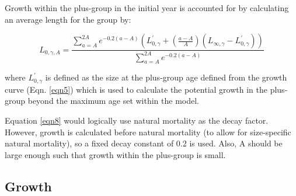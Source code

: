 \documentclass[11pt,
  english,
  letterpaper,
]{article}
\begin{document}
\leavevmode\tagmcend\tagstructend\par


Growth within the plus-group in the initial year is accounted for by calculating an average length for the group by:

\leavevmode\tagmcend\tagstructend\par


\begin{equation}
\label{eqn8}
L_{0,\gamma,A} = \frac{\sum_{a=A}^{2A}e^{-0.2(a-A)}(L_{0,\gamma}^{'}+(\frac{a-A}{A})(L_{\infty,\gamma} - L_{0,\gamma}^{'}))}{\sum_{a=A}^{2A}e^{-0.2(a-A)}} 
\end{equation}

\leavevmode\tagmcend\tagstructend\par


where {\(L_{0,\gamma}^{'}\)\leavevmode\tagmcend\tagstructend} is defined as the size at the plus-group age defined from the growth curve (Eqn. \ref{eqn5}) which is used to calculate the potential growth in the plus-group beyond the maximum age set within the model.

\leavevmode\tagmcend\tagstructend\par


Equation \ref{eqn8} would logically use natural mortality as the decay factor. However, growth is calculated before natural mortality (to allow for size-specific natural mortality), so a fixed decay constant of 0.2 is used. Also, A should be large enough such that growth within the plus-group is small.

\leavevmode\tagmcend\tagstructend\par


\hypertarget{growth}{%
\subsection{Growth}\label{growth}}

\leavevmode\tagmcend\tagstructend

\end{document}

